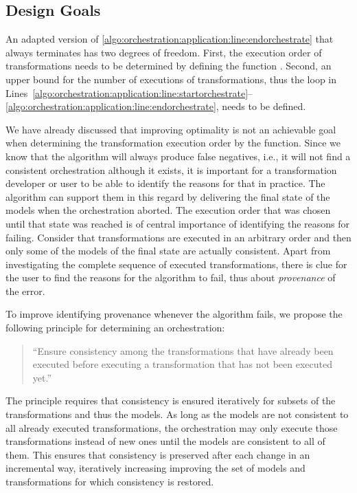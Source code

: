 
\subsection{Design Goals}
\label{chap:orchestration:algorithm:goals}

An adapted version of \autoref{algo:orchestration:application:line:endorchestrate} that always terminates has two degrees of freedom.
First, the execution order of transformations needs to be determined by defining the function .
Second, an upper bound for the number of executions of transformations, thus the loop in Lines~\ref{algo:orchestration:application:line:startorchestrate}--\ref{algo:orchestration:application:line:endorchestrate}, needs to be defined.

We have already discussed that improving optimality is not an achievable goal when determining the transformation execution order by the  function.
Since we know that the algorithm will always produce false negatives, i.e., it will not find a consistent orchestration although it exists, it is important for a transformation developer or user to be able to identify the reasons for that in practice.
The algorithm can support them in this regard by delivering the final state of the models when the orchestration aborted.
The execution order that was chosen until that state was reached is of central importance of identifying the reasons for failing.
Consider that transformations are executed in an arbitrary order and then only some of the models of the final state are actually consistent.
Apart from investigating the complete sequence of executed transformations, there is clue for the user to find the reasons for the algorithm to fail, thus about \emph{provenance} of the error.

To improve identifying provenance whenever the algorithm fails, we propose the following principle for determining an orchestration:
\begin{quote}
    \enquote{Ensure consistency among the transformations that have already been executed before executing a transformation that has not been executed yet.} \cite{gleitze2020orchestration}
\end{quote}
The principle requires that consistency is ensured iteratively for subsets of the transformations and thus the models.
As long as the models are not consistent to all already executed transformations, the orchestration may only execute those transformations instead of new ones until the models are consistent to all of them.
This ensures that consistency is preserved after each change in an incremental way, iteratively increasing improving the set of models and transformations for which consistency is restored.

